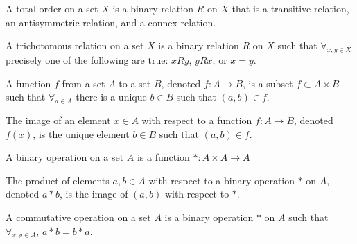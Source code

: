             \begin{definition}
                \label{Definition:MathEnc:Analysis:Sum:TotalOrder}
                A total order on a set $X$ is a binary relation $R$
                on $X$ that is a transitive relation, an
                antisymmetric relation, and a connex relation.
            \end{definition}
            \begin{definition}
                \label{%
                    Definition:MathEnc:Analysis:%
                    Sum:TrichotomousRelation%
                }
                A trichotomous relation on a set $X$ is a
                binary relation $R$ on $X$ such that
                $\forall_{x,y\in X}$ precisely one of the
                following are true: $xRy$, $yRx$, or $x=y$.
            \end{definition}
            \begin{definition}
                \label{Definition:MathEnc:Analysis:Sum:Function}
                A function $f$ from a set $A$ to a set $B$,
                denoted $f:A\rightarrow B$,
                is a subset $f\subset A\times B$ such that
                $\forall_{a\in A}$ there is
                a unique $b\in B$ such that $(a,b)\in f$.
            \end{definition}
            \begin{definition}
                \label{Definition:MathEnc:Analysis:Sum:Image}
                The image of an element $x\in A$ with respect to a
                function $f:A\rightarrow B$, denoted $f(x)$, is the
                unique element $b\in B$ such that $(a,b)\in f$.
            \end{definition}
            \begin{definition}
                \label{%
                    Definition:MathEnc:Analysis:Sum:BinaryOperation%
                }
                A binary operation on a set $A$ is a function
                $*:A\times A\rightarrow A$
            \end{definition}
            \begin{definition}
                \label{Definition:MathEnc:Analysis:Sum:Product}
                The product of elements $a,b\in A$ with respect
                to a binary operation
                $*$ on $A$, denoted $a*b$, is the image of $(a,b)$
                with respect to $*$.
            \end{definition}
            \begin{definition}
                \label{%
                    Definition:MathEnc:Analysis:%
                    Sum:CommunativeOperation%
                }
                A commutative operation on a set $A$
                is a binary operation $*$ on $A$
                such that $\forall_{x,y\in A}$, $a*b=b*a$.
            \end{definition}
